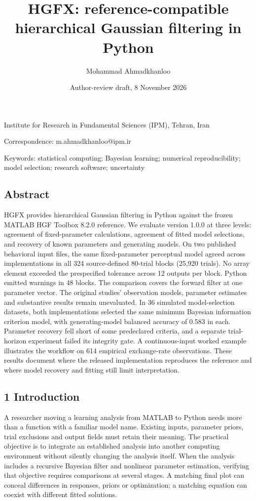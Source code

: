 \documentclass[
  11pt,
]{article}
\title{HGFX: reference-compatible hierarchical Gaussian filtering in
Python}
\author{Mohammad Ahmadkhanloo}
\date{Author-review draft, 8 November 2026}
\begin{document}
\maketitle

Institute for Research in Fundamental Sciences (IPM), Tehran, Iran

Correspondence: m.ahmadkhanloo@ipm.ir

Keywords: statistical computing; Bayesian learning; numerical
reproducibility; model selection; research software; uncertainty

\subsection{Abstract}\label{abstract}

HGFX provides hierarchical Gaussian filtering in Python against the
frozen MATLAB HGF Toolbox 8.2.0 reference. We evaluate version 1.0.0 at
three levels: agreement of fixed-parameter calculations, agreement of
fitted model selections, and recovery of known parameters and generating
models. On two published behavioral input files, the same
fixed-parameter perceptual model agreed across implementations in all
324 source-defined 80-trial blocks (25,920 trials). No array element
exceeded the prespecified tolerance across 12 outputs per block. Python
emitted warnings in 48 blocks. The comparison covers the forward filter
at one parameter vector. The original studies' observation models,
parameter estimates and substantive results remain unevaluated. In 36
simulated model-selection datasets, both implementations selected the
same minimum Bayesian information criterion model, with generating-model
balanced accuracy of 0.583 in each. Parameter recovery fell short of
some predeclared criteria, and a separate trial-horizon experiment
failed its integrity gate. A continuous-input worked example illustrates
the workflow on 614 empirical exchange-rate observations. These results
document where the released implementation reproduces the reference and
where model recovery and fitting still limit interpretation.

\subsection{1 Introduction}\label{introduction}

A researcher moving a learning analysis from MATLAB to Python needs more
than a function with a familiar model name. Existing inputs, parameter
priors, trial exclusions and output fields must retain their meaning.
The practical objective is to integrate an established analysis into
another computing environment without silently changing the analysis
itself. When the analysis includes a recursive Bayesian filter and
nonlinear parameter estimation, verifying that objective requires
comparisons at several stages. A matching final plot can conceal
differences in responses, priors or optimization; a matching equation
can coexist with different fitted solutions.
\end{document}
